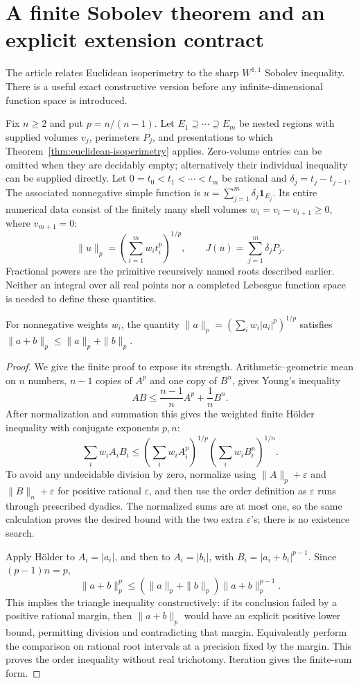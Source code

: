 \section{A finite Sobolev theorem and an explicit extension contract}
\label{sec:sobolev}

The article relates Euclidean isoperimetry to the sharp \(W^{1,1}\)
Sobolev inequality. There is a useful exact constructive version before
any infinite-dimensional function space is introduced.

Fix \(n\geq2\) and put \(p=n/(n-1)\). Let
\(E_1\supseteq\cdots\supseteq E_m\) be nested regions with supplied
volumes \(v_j\), perimeters \(P_j\), and presentations to which
Theorem~\ref{thm:euclidean-isoperimetry} applies. Zero-volume entries
can be omitted when they are decidably empty; alternatively their
individual inequality can be supplied directly. Let
\(0=t_0<t_1<\cdots<t_m\) be rational and
\(\delta_j=t_j-t_{j-1}\). The associated nonnegative simple function is
\(u=\sum_{j=1}^m\delta_j\mathbf1_{E_j}\). Its entire numerical data
consist of the finitely many shell volumes
\(w_i=v_i-v_{i+1}\geq0\), where \(v_{m+1}=0\):
\[
 \|u\|_p=\left(\sum_{i=1}^m w_i t_i^p\right)^{1/p},
 \qquad J(u)=\sum_{j=1}^m\delta_jP_j.
\]
Fractional powers are the primitive recursively named roots described
earlier. Neither an integral over all real points nor a completed
Lebesgue function space is needed to define these quantities.

\begin{lemma}
For nonnegative weights \(w_i\), the quantity
\(\|a\|_p=(\sum_i w_i|a_i|^p)^{1/p}\) satisfies
\(\|a+b\|_p\leq\|a\|_p+\|b\|_p\).
\end{lemma}
\begin{proof}
We give the finite proof to expose its strength. Arithmetic--geometric
mean on \(n\) numbers, \(n-1\) copies of \(A^p\) and one copy of
\(B^n\), gives Young's inequality
\[
 AB\leq\frac{n-1}{n}A^p+\frac1nB^n.
\]
After normalization and summation this gives the weighted finite
H\"older inequality with conjugate exponents \(p,n\):
\[
 \sum_iw_i A_i B_i
 \leq\left(\sum_iw_i A_i^p\right)^{1/p}
       \left(\sum_iw_i B_i^n\right)^{1/n}.
\]
To avoid any undecidable division by zero, normalize using
\(\|A\|_p+\varepsilon\) and \(\|B\|_n+\varepsilon\) for positive
rational \(\varepsilon\), and then use the order definition as
\(\varepsilon\) runs through prescribed dyadics. The normalized sums
are at most one, so the same calculation proves the desired bound with
the two extra \(\varepsilon\)'s; there is no existence search.

Apply H\"older to \(A_i=|a_i|\), and then to \(A_i=|b_i|\),
with \(B_i=|a_i+b_i|^{p-1}\). Since \((p-1)n=p\),
\[
 \|a+b\|_p^p
 \leq(\|a\|_p+\|b\|_p)\|a+b\|_p^{p-1}.
\]
This implies the triangle inequality constructively: if its conclusion
failed by a positive rational margin, then \(\|a+b\|_p\) would have
an explicit positive lower bound, permitting division and contradicting
that margin. Equivalently perform the comparison on rational root
intervals at a precision fixed by the margin. This proves the order
inequality without real trichotomy. Iteration gives the finite-sum form.
\end{proof}

